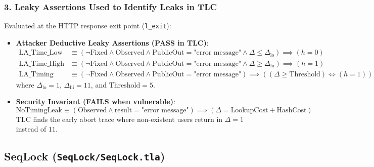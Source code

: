 \documentclass[a4paper,11pt]{article}
\begin{document}
\subsubsection{3. Leaky Assertions Used to Identify Leaks in TLC}
Evaluated at the HTTP response exit point (\texttt{l\_exit}):
\begin{itemize}
    \item \textbf{Attacker Deductive Leaky Assertions (PASS in TLC)}:
    \begin{align*}
        \text{LA\_Time\_Low} &\equiv (\neg\text{Fixed} \land \text{Observed} \land \text{PublicOut} = \text{"error message"} \land \Delta \le \Delta_{\text{lo}}) \implies (h = 0)\\
        \text{LA\_Time\_High} &\equiv (\neg\text{Fixed} \land \text{Observed} \land \text{PublicOut} = \text{"error message"} \land \Delta \ge \Delta_{\text{hi}}) \implies (h = 1)\\
        \text{LA\_Timing} &\equiv (\neg\text{Fixed} \land \text{Observed} \land \text{PublicOut} = \text{"error message"}) \implies ((\Delta \ge \text{Threshold}) \iff (h = 1))
    \end{align*}
    where $\Delta_{\text{lo}} = 1$, $\Delta_{\text{hi}} = 11$, and $\text{Threshold} = 5$.
    \item \textbf{Security Invariant (FAILS when vulnerable)}:
    $$\text{NoTimingLeak} \equiv (\text{Observed} \land \text{result} = \text{"error message"}) \implies (\Delta = \text{LookupCost} + \text{HashCost})$$
    TLC finds the early abort trace where non-existent users return in $\Delta = 1$ instead of $11$.
\end{itemize}

\bigskip

\subsection{SeqLock (\texttt{SeqLock/SeqLock.tla})}
\end{document}
